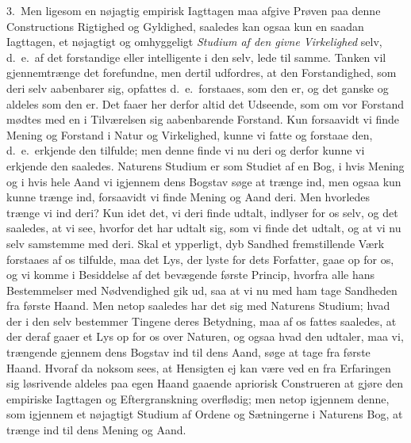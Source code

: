 \documentclass[12pt,a4paper]{book}
\newcommand{\apage}[1]{\marginnote{\footnotesize\textit{[#1]}}}
\begin{document}
3.~Men ligesom en nøjagtig empirisk Iagttagen maa afgive Prøven paa denne
Constructions Rigtighed og Gyldighed, saaledes kan ogsaa kun en saadan Iagttagen,
et nøjagtigt og  \apage{69} omhyggeligt \emph{Studium af den givne Virkelighed} selv, d.\ e.\ af det
forstandige eller intelligente i den selv, lede til samme. Tanken vil
gjennemtrænge det forefundne, men dertil udfordres, at den Forstandighed, som
deri selv aabenbarer sig, opfattes d.\ e.\ forstaaes, som den er, og det ganske
og aldeles som den er. Det faaer her derfor altid det Udseende, som om vor
Forstand mødtes med en i Tilværelsen sig aabenbarende Forstand. Kun forsaavidt vi
finde Mening og Forstand i Natur og Virkelighed, kunne vi fatte og forstaae den,
d.\ e.\ erkjende den tilfulde; men denne finde vi nu deri og derfor kunne vi
erkjende den saaledes. Naturens Studium er som Studiet af en Bog, i hvis Mening
og i hvis hele Aand vi igjennem dens Bogstav søge at trænge ind, men ogsaa kun
kunne trænge ind, forsaavidt vi finde Mening og Aand deri. Men hvorledes trænge
vi ind deri? Kun idet det, vi deri finde udtalt, indlyser for os selv, og det
saaledes, at vi see, hvorfor det har udtalt sig, som vi finde det udtalt, og at
vi nu selv samstemme med deri. Skal et ypperligt, dyb Sandhed fremstillende Værk
forstaaes af os tilfulde, maa det Lys, der lyste for dets Forfatter, gaae op for
os, og vi komme i Besiddelse af det bevægende første Princip, hvorfra alle hans
Bestemmelser med Nødvendighed gik ud, saa at vi nu med ham tage Sandheden fra
første Haand.
\apage{70} Men netop saaledes har det sig med Naturens Studium; hvad der i den selv
bestemmer Tingene deres Betydning, maa af os fattes saaledes, at der deraf gaaer
et Lys op for os over Naturen, og ogsaa hvad den udtaler, maa vi, trængende
gjennem dens Bogstav ind til dens Aand, søge at tage fra første Haand. Hvoraf da
noksom sees, at Hensigten ej kan være ved en fra Erfaringen sig løsrivende
aldeles paa egen Haand gaaende apriorisk Construeren at gjøre den empiriske
Iagttagen og Eftergranskning overflødig; men netop igjennem denne, som igjennem
et nøjagtigt Studium af Ordene og Sætningerne i Naturens Bog, at trænge ind til
dens Mening og Aand.
\end{document}
